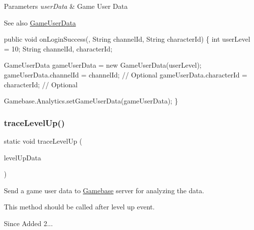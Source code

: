 \begin{DoxyParams}{Parameters}
{\em user\+Data} & Game User Data \\
\hline
\end{DoxyParams}
\begin{DoxySeeAlso}{See also}
\hyperlink{}{Game\+User\+Data} 
\begin{DoxyCode}
\textcolor{keyword}{public} \textcolor{keywordtype}{void} onLoginSuccess(, String channelId, String characterId) \{
    \textcolor{keywordtype}{int} userLevel = 10;
    String channelId, characterId;

    GameUserData gameUserData = \textcolor{keyword}{new} GameUserData(userLevel);
    gameUserData.channelId = channelId; \textcolor{comment}{// Optional}
    gameUserData.characterId = characterId; \textcolor{comment}{// Optional}

    Gamebase.Analytics.setGameUserData(gameUserData);
\}
\end{DoxyCode}
 
\end{DoxySeeAlso}
\mbox{\label{classcom_1_1toast_1_1android_1_1gamebase_1_1_gamebase_1_1_analytics_aa814a3056950011e47c8d7fcc83624b6}} 
\subsubsection{\texorpdfstring{trace\+Level\+Up()}{traceLevelUp()}}
{\footnotesize\ttfamily static void trace\+Level\+Up (\begin{DoxyParamCaption}\item[{Level\+Up\+Data}]{level\+Up\+Data }\end{DoxyParamCaption})\hspace{0.3cm}{\ttfamily [static]}}



Send a game user data to \hyperlink{classcom_1_1toast_1_1android_1_1gamebase_1_1_gamebase}{Gamebase} server for analyzing the data. 

This method should be called after level up event.

\begin{DoxySince}{Since}
Added 2... 
\end{DoxySince}

